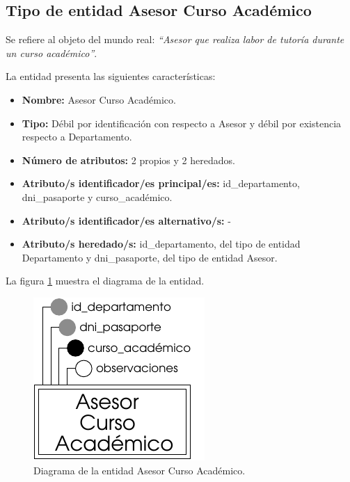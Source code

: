 \subsection{Tipo de entidad Asesor Curso Académico}

   \begin{description}

   \item[Definición] Se refiere al objeto del mundo real: \emph{``Asesor
   que realiza labor de tutoría durante un curso académico''}.

   \item[Características] La entidad presenta las siguientes características:
      \begin{itemize}
         \item \textbf{Nombre:} Asesor Curso Académico.
         \item \textbf{Tipo:} Débil por identificación con respecto a Asesor y débil por existencia respecto a Departamento.
         \item \textbf{Número de atributos:} 2 propios y 2 heredados.
         \item \textbf{Atributo/s identificador/es principal/es:} id\_departamento,\\ dni\_pasaporte y curso\_académico.
         \item \textbf{Atributo/s identificador/es alternativo/s:} -
         \item \textbf{Atributo/s heredado/s:} id\_departamento, del tipo de entidad Departamento y dni\_pasaporte, del tipo de entidad Asesor.
      \end{itemize}

   \item[Diagrama] La figura \ref{diagramaAsesorCA} muestra el diagrama de la entidad.
   \item \begin{figure}[!ht]
            \begin{center}
            \includegraphics[]{07.Modelo_Entidad-Interrelacion/7.2.Analisis_Entidades/diagramas/asesorca.pdf}
            \caption{Diagrama de la entidad Asesor Curso Académico.}
            \label{diagramaAsesorCA}
            \end{center}
         \end{figure}


\end{description}
